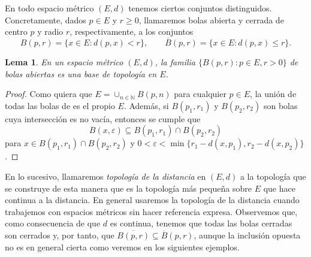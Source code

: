 \documentclass[a4paper,10pt]{article}
\theoremstyle{teorema}
\newtheorem{lema}[teor]{Lema}
\theoremstyle{plano}
\theoremstyle{titulo}
\begin{document}
En todo espacio métrico $(E,d)$ tenemos ciertos conjuntos distinguidos. Concretamente, dados $p\in E$ y $r\geq 0$, llamaremos bolas abierta y cerrada de centro $p$ y radio $r$, respectivamente, a los conjuntos
\[B(p,r)=\{x\in E:d(p,x)<r\},\qquad \overline{B}(p,r)=\{x\in E:d(p,x)\leq r\}.\]

\begin{lema}
En un espacio métrico $(E,d)$, la familia $\{B(p,r):p\in E,r>0\}$ de bolas abiertas es una base de topología en $E$.
\end{lema}

\begin{proof}
Como quiera que $E=\cup_{n\in\mathbb{N}}B(p,n)$ para cualquier $p\in E$, la unión de todas las bolas de es el propio $E$. Además, si $B(p_1,r_1)$ y $B(p_2,r_2)$ son bolas cuya intersección es no vacía, entonces se cumple que 
\[B(x,\varepsilon)\subseteq B(p_1,r_1)\cap B(p_2,r_2)\]
para $x\in B(p_1,r_1)\cap B(p_2,r_2)$ y $0<\varepsilon<\min\{r_1-d(x,p_1),r_2-d(x,p_2)\}$.
\end{proof}


En lo sucesivo, llamaremos \emph{topología de la distancia} en $(E,d)$ a la topología que se construye de esta manera que es la topología más pequeña sobre $E$ que hace continua a la distancia. En general usaremos la topología de la distancia cuando trabajemos con espacios métricos sin hacer referencia expresa. Observemos que, como consecuencia de que $d$ es continua, tenemos que todas las bolas cerradas son cerrados y, por tanto, que $\overline{B(p,r)}\subseteq\overline B(p,r)$, aunque la inclusión opuesta no es en general cierta como veremos en los siguientes ejemplos.
\end{document}
